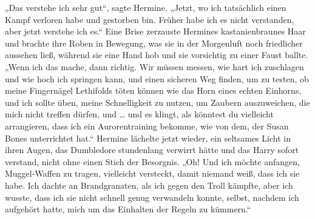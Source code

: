 „Das verstehe ich sehr gut“, sagte Hermine.
„Jetzt, wo ich tatsächlich einen Kampf verloren habe und gestorben bin. Früher habe ich es nicht verstanden, aber jetzt verstehe ich es.“
Eine Brise zerzauste Hermines kastanienbraunes Haar und brachte ihre Roben in Bewegung, was sie in der Morgenluft noch friedlicher aussehen ließ, während sie eine Hand hob und sie vorsichtig zu einer Faust ballte.
„Wenn ich das mache, dann richtig. Wir müssen messen, wie hart ich zuschlagen und wie hoch ich springen kann, und einen sicheren Weg finden, um zu testen, ob meine Fingernägel Lethifolds töten können wie das Horn eines echten Einhorns, und ich sollte üben, meine Schnelligkeit zu nutzen, um Zaubern auszuweichen, die mich nicht treffen dürfen, und … und es klingt, als könntest du vielleicht arrangieren, dass ich ein Aurorentraining bekomme, wie von dem, der Susan Bones unterrichtet hat.“
Hermine lächelte jetzt wieder, ein seltsames Licht in ihren Augen, das Dumbledore stundenlang verwirrt hätte und das Harry sofort verstand, nicht ohne einen Stich der Besorgnis.
„Oh! Und ich möchte anfangen, Muggel-Waffen zu tragen, vielleicht versteckt, damit niemand weiß, dass ich sie habe. Ich dachte an Brandgranaten, als ich gegen den Troll kämpfte, aber ich wusste, dass ich sie nicht schnell genug verwandeln konnte, selbst, nachdem ich aufgehört hatte, mich um das Einhalten der Regeln zu kümmern.“

